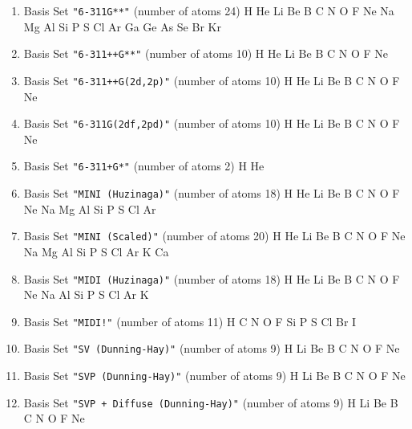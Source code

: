 \begin{enumerate}
\item Basis Set \verb#"6-311G**"# (number of atoms 24) \newline
  H He Li Be B C N O F Ne Na Mg Al Si P S Cl Ar Ga Ge As Se Br Kr


\item Basis Set \verb#"6-311++G**"# (number of atoms 10) \newline
  H He Li Be B C N O F Ne


\item Basis Set \verb#"6-311++G(2d,2p)"# (number of atoms 10) \newline
  H He Li Be B C N O F Ne


\item Basis Set \verb#"6-311G(2df,2pd)"# (number of atoms 10) \newline
  H He Li Be B C N O F Ne


\item Basis Set \verb#"6-311+G*"# (number of atoms 2) \newline
  H He


\item Basis Set \verb#"MINI (Huzinaga)"# (number of atoms 18) \newline
  H He Li Be B C N O F Ne Na Mg Al Si P S Cl Ar


\item Basis Set \verb#"MINI (Scaled)"# (number of atoms 20) \newline
  H He Li Be B C N O F Ne Na Mg Al Si P S Cl Ar K Ca


\item Basis Set \verb#"MIDI (Huzinaga)"# (number of atoms 18) \newline
  H He Li Be B C N O F Ne Na Al Si P S Cl Ar K


\item Basis Set \verb#"MIDI!"# (number of atoms 11) \newline
  H C N O F Si P S Cl Br I


\item Basis Set \verb#"SV (Dunning-Hay)"# (number of atoms 9) \newline
  H Li Be B C N O F Ne


\item Basis Set \verb#"SVP (Dunning-Hay)"# (number of atoms 9) \newline
  H Li Be B C N O F Ne


\item Basis Set \verb#"SVP + Diffuse (Dunning-Hay)"# (number of atoms 9) \newline
  H Li Be B C N O F Ne



\end{enumerate}
